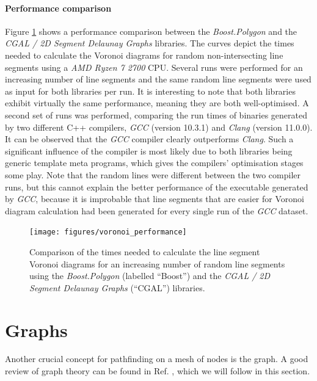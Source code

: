 \paragraph{Performance comparison}
Figure \ref{fig:voro_performance} shows a performance comparison between the \textit{Boost.Polygon} and
the \textit{CGAL / 2D Segment Delaunay Graphs} libraries.
The curves depict the times needed to calculate the Voronoi diagrams for random non-intersecting line segments
using a \textit{AMD Ryzen 7 2700} CPU.
Several runs were performed for an increasing number of line segments and the same random line segments were
used as input for both libraries per run.
It is interesting to note that both libraries exhibit virtually the same performance, meaning they are both
well-optimised.
A second set of runs was performed, comparing the run times of binaries generated by two different C++ compilers,
\textit{GCC} \cite{web_gcc} (version 10.3.1) and \textit{Clang} \cite{web_clang} (version 11.0.0).
It can be observed that the \textit{GCC} compiler clearly outperforms \textit{Clang}.
Such a significant influence of the compiler is most likely due to both libraries being generic template meta
programs, which gives the compilers' optimisation stages some play.
Note that the random lines were different between the two compiler runs, but this cannot explain the better
performance of the executable generated by \textit{GCC}, because it is improbable that line segments that
are easier for Voronoi diagram calculation had been generated for every single run of the \textit{GCC} dataset.


\begin{figure}[htb]
	\begin{center}
		\texttt{[image: figures/voronoi\_performance]}
	\end{center}
	\caption[Voronoi calculation performance.]{
		Comparison of the times needed to calculate the line segment Voronoi diagrams for an increasing
		number of random line segments using the \textit{Boost.Polygon} (labelled ``Boost'') \cite{web_boost_polygon}
		and the \textit{CGAL / 2D Segment Delaunay Graphs} (``CGAL'') \cite{web_2dsegdel} libraries.
		\label{fig:voro_performance}}
\end{figure}



\section{Graphs}
\label{sec:graphs}
Another crucial concept for pathfinding on a mesh of nodes is the graph.
A good review of graph theory can be found in Ref. \cite{FUH_algo_graphs_2021},
which we will follow in this section.

